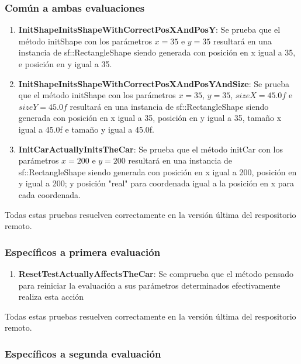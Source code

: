 \documentclass[12pt,a4paper,twoside,openright]{book}
\begin{document}
\subsubsection{Común a ambas evaluaciones}

\begin{enumerate}
 \item \textbf{InitShapeInitsShapeWithCorrectPosXAndPosY}: Se prueba que el método initShape con los parámetros $x=35$ e $y=35$ resultará en una instancia de sf::RectangleShape siendo generada con posición en x igual a 35, e posición en y igual a 35.
 \item \textbf{InitShapeInitsShapeWithCorrectPosXAndPosYAndSize}: Se prueba que el método initShape con los parámetros $x=35$, $y=35$, $sizeX = 45.0f$ e $sizeY = 45.0f$ resultará en una instancia de sf::RectangleShape siendo generada con posición en x igual a 35, posición en y igual a 35, tamaño x igual a 45.0f e tamaño y igual a 45.0f.
 \item \textbf{InitCarActuallyInitsTheCar}: Se prueba que el método initCar con los parámetros $x=200$ e $y=200$ resultará en una instancia de sf::RectangleShape siendo generada con posición en x igual a 200, posición en y igual a 200; y posición "real" para coordenada igual a la posición en x para cada coordenada.
\end{enumerate}

Todas estas pruebas resuelven correctamente en la versión última del respositorio remoto.

\subsubsection{Específicos a primera evaluación}

\begin{enumerate}
  \item \textbf{ResetTestActuallyAffectsTheCar}: Se comprueba que el método pensado para reiniciar la evaluación a sus parámetros determinados efectivamente realiza esta acción
\end{enumerate}

Todas estas pruebas resuelven correctamente en la versión última del respositorio remoto.

\subsubsection{Específicos a segunda evaluación}
\end{document}
